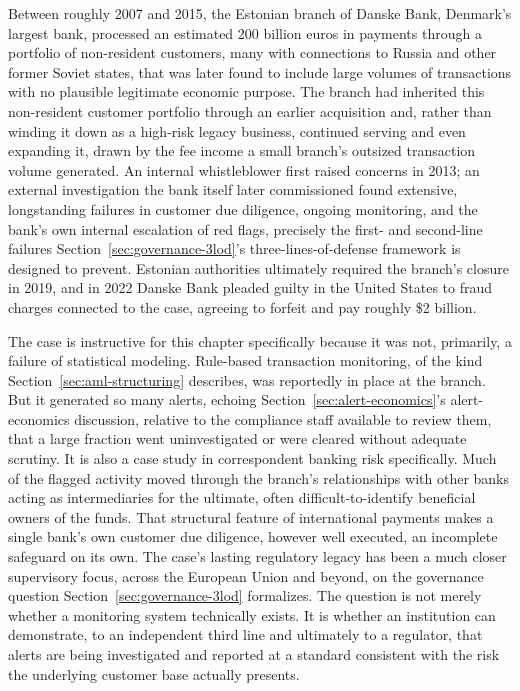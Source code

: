 \documentclass[../ai_in_finance]{subfiles}
\begin{document}
Between roughly 2007 and 2015, the Estonian branch of Danske Bank, Denmark's largest bank, processed an estimated 200 billion euros in payments through a portfolio of non-resident customers, many with connections to Russia and other former Soviet states, that was later found to include large volumes of transactions with no plausible legitimate economic purpose. The branch had inherited this non-resident customer portfolio through an earlier acquisition and, rather than winding it down as a high-risk legacy business, continued serving and even expanding it, drawn by the fee income a small branch's outsized transaction volume generated. An internal whistleblower first raised concerns in 2013; an external investigation the bank itself later commissioned found extensive, longstanding failures in customer due diligence, ongoing monitoring, and the bank's own internal escalation of red flags, precisely the first- and second-line failures Section~\ref{sec:governance-3lod}'s three-lines-of-defense framework is designed to prevent. Estonian authorities ultimately required the branch's closure in 2019, and in 2022 Danske Bank pleaded guilty in the United States to fraud charges connected to the case, agreeing to forfeit and pay roughly \$2 billion.

The case is instructive for this chapter specifically because it was not, primarily, a failure of statistical modeling. Rule-based transaction monitoring, of the kind Section~\ref{sec:aml-structuring} describes, was reportedly in place at the branch. But it generated so many alerts, echoing Section~\ref{sec:alert-economics}'s alert-economics discussion, relative to the compliance staff available to review them, that a large fraction went uninvestigated or were cleared without adequate scrutiny. It is also a case study in correspondent banking risk specifically. Much of the flagged activity moved through the branch's relationships with other banks acting as intermediaries for the ultimate, often difficult-to-identify beneficial owners of the funds. That structural feature of international payments makes a single bank's own customer due diligence, however well executed, an incomplete safeguard on its own. The case's lasting regulatory legacy has been a much closer supervisory focus, across the European Union and beyond, on the governance question Section~\ref{sec:governance-3lod} formalizes. The question is not merely whether a monitoring system technically exists. It is whether an institution can demonstrate, to an independent third line and ultimately to a regulator, that alerts are being investigated and reported at a standard consistent with the risk the underlying customer base actually presents.
\end{document}
